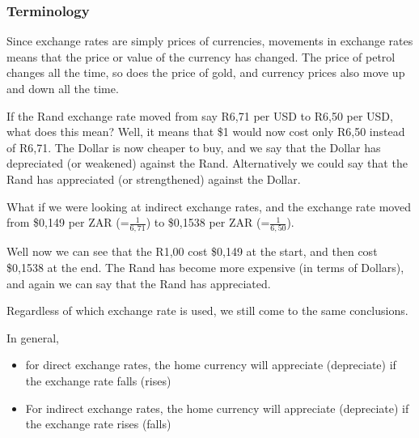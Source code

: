         \label{m39335*uid5}
            \subsubsection{ Terminology}
            \nopagebreak
            
          
          \label{m39335*id67731}Since exchange rates are simply prices of currencies, movements in exchange rates means that the price or value of the currency has changed. The price of petrol changes all the time, so does the price of gold, and currency prices also move up and down all the time.\par 
          \label{m39335*id67737}If the Rand exchange rate moved from say R6,71 per USD to R6,50 per USD, what does this mean? Well, it means that \$1 would now cost only R6,50 instead of R6,71. The Dollar is now cheaper to buy, and we say that the Dollar has depreciated (or weakened) against the Rand. Alternatively we could say that the Rand has appreciated (or strengthened) against the Dollar.\par 
          \label{m39335*id67743}What if we were looking at indirect exchange rates, and the exchange rate moved from \$0,149 per ZAR (=\begin{math}\frac{1}{6,71}\end{math}) to \$0,1538 per ZAR (=\begin{math}\frac{1}{6,50}\end{math}).\par 
          \label{m39335*id67782}Well now we can see that the R1,00 cost \$0,149 at the start, and then cost \$0,1538 at the end. The Rand has become more expensive (in terms of Dollars), and again we can say that the Rand has appreciated.\par 
          \label{m39335*id67787}Regardless of which exchange rate is used, we still come to the same conclusions.\par 
          \label{m39335*id67791}In general,\par 
          \label{m39335*id67794}\begin{itemize}[noitemsep]
            \label{m39335*uid6}\item for direct exchange rates, the home currency will appreciate (depreciate) if the exchange rate falls (rises)
\label{m39335*uid7}\item For indirect exchange rates, the home currency will appreciate (depreciate) if the exchange rate rises (falls)
\end{itemize}
        
